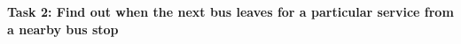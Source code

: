 \documentclass[10pt,twocolumn]{article}
\begin{document}
\textbf{Task 2: Find out when the next bus leaves for a particular service from a nearby bus stop}
\begin{figure}[htbp]
    \begin{minipage}[b]{0.5\linewidth}
        \centering
    \end{minipage}
    \hfill
    \begin{minipage}[b]{0.5\linewidth}
        \centering
    \end{minipage}
\end{figure}
\end{document}
